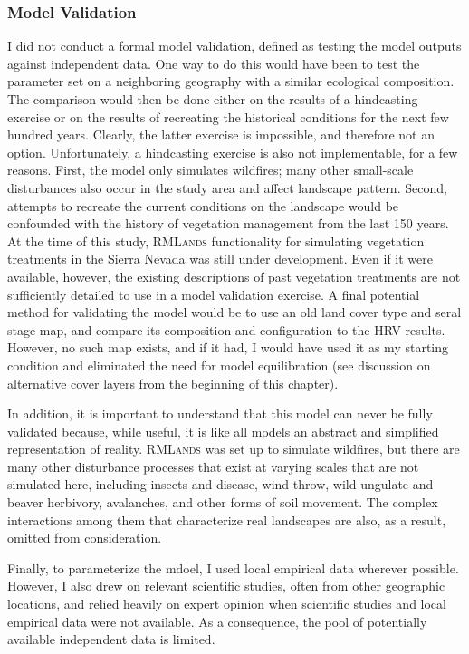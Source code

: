 \subsubsection*{Model Validation} I did not conduct a formal model validation, defined as testing the model outputs against independent data. One way to do this would have been to test the parameter set on a neighboring geography with a similar ecological composition. The comparison would then be done either on the results of a hindcasting exercise or on the results of recreating the historical conditions for the next few hundred years. Clearly, the latter exercise is impossible, and therefore not an option. Unfortunately, a hindcasting exercise is also not implementable, for a few reasons. First, the model only simulates wildfires; many other small-scale disturbances also occur in the study area and affect landscape pattern. Second, attempts to recreate the current conditions on the landscape would be confounded with the history of vegetation management from the last 150 years. At the time of this study, \textsc{RMLands} functionality for simulating vegetation treatments in the Sierra Nevada was still under development. Even if it were available, however, the existing descriptions of past vegetation treatments are not sufficiently detailed to use in a model validation exercise. A final potential method for validating the model would be to use an old land cover type and seral stage map, and compare its composition and configuration to the HRV results. However, no such map exists, and if it had, I would have used it as my starting condition and eliminated the need for model equilibration (see discussion on alternative cover layers from the beginning of this chapter).

In addition, it is important to understand that this model can never be fully validated because, while useful, it is like all models an abstract and simplified representation of reality. \textsc{RMLands} was set up to simulate wildfires, but there are many other disturbance processes that exist at varying scales that are not simulated here, including insects and disease, wind-throw, wild ungulate and beaver herbivory, avalanches, and other forms of soil movement. The complex interactions among them that characterize real landscapes are also, as a result, omitted from consideration.

Finally, to parameterize the mdoel, I used local empirical data wherever possible. However, I also drew on relevant scientific studies, often from other geographic locations, and relied heavily on expert opinion when scientific studies and local empirical data were not available. As a consequence, the pool of potentially available independent data is limited. 

